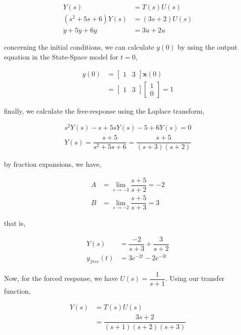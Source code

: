 \documentclass[12pt]{article}
\begin{document}
		\begin{align*}
			Y(s) &= T(s)U(s)\\
			(s^{2}+5s+6)Y(s) &= (3s+2)U(s)\\
			\ddot{y} + 5\dot{y} + 6y &= 3\dot{u} + 2u
		\end{align*}
		
		concerning the initial conditions, we can calculate $y(0)$ by using the output equation in the State-Space model for $t = 0$,
		
		\begin{align*}
			y(0) &= \begin{bmatrix}
				1 & 3
			\end{bmatrix}\mathbf{x}(0)\\
				 &= \begin{bmatrix}
				 1 & 3
				 \end{bmatrix}\begin{bmatrix}
					 1\\
					 0
				 \end{bmatrix} = 1
		\end{align*}
		
		finally, we calculate the free-response using the Laplace transform,
		
		\begin{align*}
			s^{2}Y(s) - s + 5sY(s) - 5 + 6Y(s) = 0\\
			Y(s) = \dfrac{s+5}{s^{2}+5s+6} = \dfrac{s+5}{(s+3)(s+2)}
		\end{align*}
		
		by fraction expansions, we have,
		
		\begin{align*}
			A &= \lim\limits_{s \rightarrow -3}\dfrac{s+5}{s+2} = -2\\
			B &= \lim\limits_{s \rightarrow -2}\dfrac{s+5}{s+3} = 3
		\end{align*}
		
		that is,
		
		\begin{align*}
			Y(s) &= \dfrac{-2}{s+3} + \dfrac{3}{s+2}\\
			y_{free}(t) &= 3e^{-2t} - 2e^{-3t}
		\end{align*}
		
		Now, for the forced response, we have $U(s) = \dfrac{1}{s+1}$. Using our transfer function,
		
		\begin{align*}
			Y(s) &= T(s)U(s)\\
				 &= \dfrac{3s+2}{(s+1)(s+2)(s+3)}
		\end{align*}
		
\end{document}
